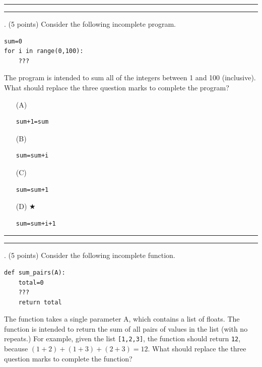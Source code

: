 \documentclass{article}
\newcounter{question}
\begin{document}
\vspace*{2em}
\hrule
\vspace{2em}

\vspace{2em}
\hrule height 2pt


\newpage
{}. (5 points)
Consider the following incomplete program.
\begin{verbatim}
sum=0
for i in range(0,100):
    ???

\end{verbatim}
The program is intended to sum all of the integers between 1 and 100 (inclusive). What should replace the three question marks to complete the program?


\begin{enumerate}
\item[(A)]
\begin{verbatim}sum+1=sum \end{verbatim}

\item[(B)]
\begin{verbatim}sum=sum+i \end{verbatim}

\item[(C)]
\begin{verbatim}sum=sum+1\end{verbatim}

\item[(D)] $\bigstar$ 
\begin{verbatim}sum=sum+i+1 \end{verbatim}

\end{enumerate}

\vspace*{2em}
\hrule
\vspace{2em}

\vspace{2em}
\hrule height 2pt


\newpage
{}. (5 points)
Consider the following incomplete function.
\begin{verbatim}
def sum_pairs(A):
    total=0
    ???
    return total
\end{verbatim}
The function takes a single parameter A, which contains a list of floats. The function is intended to return the sum of all pairs of values in the list (with no repeats.) For example, given the list \verb|[1,2,3]|, the function should return \verb|12|, because $(1+2)+(1+3)+(2+3)=12$. What should replace the three question marks to complete the function?
\end{document}
